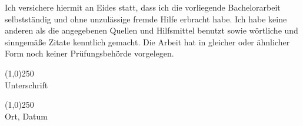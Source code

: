 
Ich versichere hiermit an Eides statt, dass ich die vorliegende Bachelorarbeit selbstständig und ohne unzulässige fremde Hilfe erbracht habe. Ich habe keine anderen als die angegebenen Quellen und Hilfsmittel benutzt sowie wörtliche und sinngemäße Zitate kenntlich gemacht. Die Arbeit hat in gleicher oder ähnlicher Form noch keiner Prüfungsbehörde vorgelegen. 

\vspace*{4cm}

\begin{flushleft}
\line(1,0){250}\\
Unterschrift
\end{flushleft}

\bigskip

\begin{flushleft}
\line(1,0){250}\\
Ort, Datum
\end{flushleft}
\clearpage